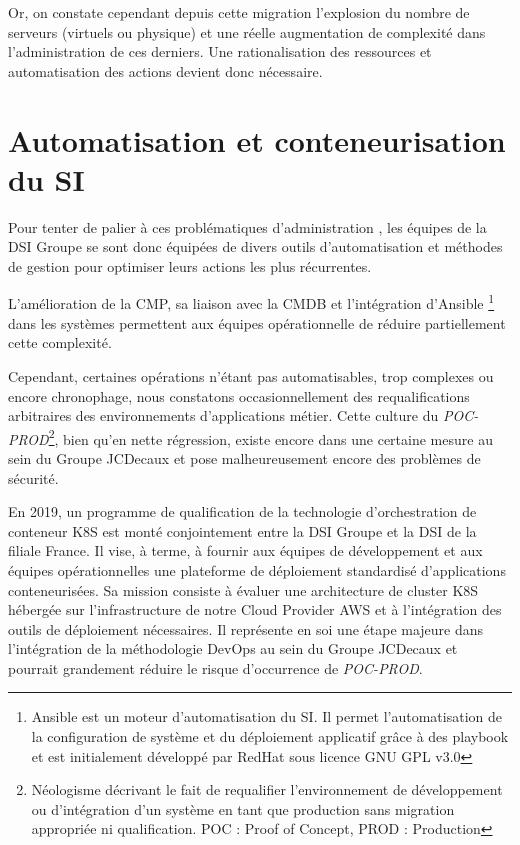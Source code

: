 Or, on constate cependant depuis cette migration l'explosion du nombre de serveurs (virtuels ou physique) et une réelle
augmentation de complexité dans l'administration de ces derniers. Une rationalisation des ressources et automatisation
des actions devient donc nécessaire.



\section{Automatisation et conteneurisation du SI}
Pour tenter de palier à ces problématiques d'administration , les équipes de la \ac{DSI} Groupe se sont donc équipées 
de divers outils d'automatisation et méthodes de gestion pour optimiser leurs actions les plus récurrentes.

L'amélioration de la \ac{CMP}, sa liaison avec la \ac{CMDB} et l'intégration d'Ansible \footnote{Ansible est un 
moteur d'automatisation du SI. Il permet l'automatisation de la configuration de système et du déploiement applicatif
grâce à des playbook et est initialement développé par RedHat sous licence GNU GPL v3.0} dans les systèmes permettent aux
équipes opérationnelle de réduire partiellement cette complexité.

Cependant, certaines opérations n'étant pas automatisables, trop complexes ou encore chronophage, nous constatons
occasionnellement des requalifications arbitraires des environnements d'applications métier. Cette culture du 
\emph{POC-PROD}\footnote{Néologisme décrivant le fait de requalifier l'environnement de développement ou d'intégration 
d'un système en tant que production sans migration appropriée ni qualification. \newline POC : Proof of Concept, PROD :
Production}, bien qu'en nette régression, existe encore dans une certaine mesure au sein du Groupe JCDecaux
et pose malheureusement encore des problèmes de sécurité.

En 2019, un programme de qualification de la technologie d'orchestration de conteneur \ac{K8S} est monté 
conjointement entre la \ac{DSI} Groupe et la \ac{DSI} de la filiale France. Il vise, à terme, à fournir aux équipes de 
développement et aux équipes opérationnelles une plateforme de déploiement standardisé d'applications conteneurisées.
\newline Sa mission consiste à évaluer une architecture de cluster \ac{K8S} hébergée sur l'infrastructure de notre Cloud 
Provider \ac{AWS} et à l'intégration des outils de déploiement nécessaires.
\newline Il représente en soi une étape majeure dans l'intégration de la méthodologie DevOps au sein du Groupe JCDecaux
et pourrait grandement réduire le risque d'occurrence de \emph{POC-PROD}.

